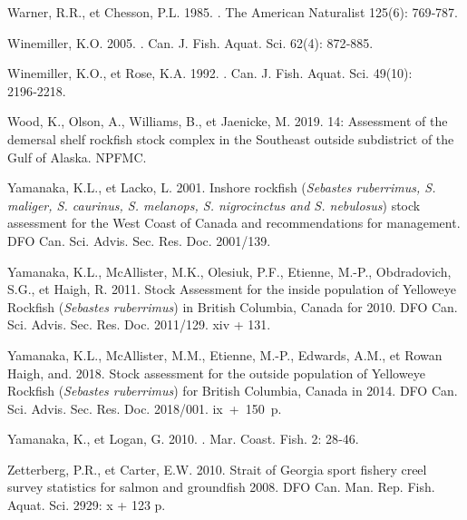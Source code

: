 \documentclass[french,11pt]{book}
\begin{document}
\begin{CSLReferences}{1}{0}
%
Warner, R.R., et Chesson, P.L. 1985. . The American Naturalist 125(6): 769‑787.

%
Winemiller, K.O. 2005. . Can. J. Fish. Aquat. Sci. 62(4): 872‑885.

%
Winemiller, K.O., et Rose, K.A. 1992. . Can. J. Fish. Aquat. Sci. 49(10): 2196‑2218.

%
Wood, K., Olson, A., Williams, B., et Jaenicke, M. 2019. 14: Assessment of the demersal shelf rockfish stock complex in the Southeast outside subdistrict of the Gulf of Alaska. {NPFMC}.

%
Yamanaka, K.L., et Lacko, L. 2001. Inshore rockfish ({\emph{Sebastes ruberrimus, S. maliger, S. caurinus, S. melanops, S. nigrocinctus and S. nebulosus}}) stock assessment for the West Coast of {Canada} and recommendations for management. DFO Can. Sci. Advis. Sec. Res. Doc. 2001/139.

%
Yamanaka, K.L., McAllister, M.K., Olesiuk, P.F., Etienne, M.-P., Obdradovich, S.G., et Haigh, R. 2011. Stock Assessment for the inside population of {Yelloweye} {Rockfish} {(\emph{Sebastes ruberrimus})} in {British Columbia}, {Canada} for 2010. DFO Can. Sci. Advis. Sec. Res. Doc. 2011/129. xiv + 131.

%
Yamanaka, K.L., McAllister, M.M., Etienne, M.-P., Edwards, A.M., et Rowan Haigh, and. 2018. Stock assessment for the outside population of {Yelloweye Rockfish} ({\emph{Sebastes ruberrimus}}) for {British Columbia, Canada} in 2014. DFO Can. Sci. Advis. Sec. Res. Doc. 2018/001. ix~+~150~p.

%
Yamanaka, K., et Logan, G. 2010. . Mar. Coast. Fish. 2: 28‑46.

%
Zetterberg, P.R., et Carter, E.W. 2010. {Strait} of {Georgia} sport fishery creel survey statistics for salmon and groundfish 2008. DFO Can. Man. Rep. Fish. Aquat. Sci. 2929: x + 123 p.

\end{CSLReferences}
\setlength{\parindent}{0in} \setlength{\leftskip}{0in} \setlength{\parskip}{4pt}
\end{document}
